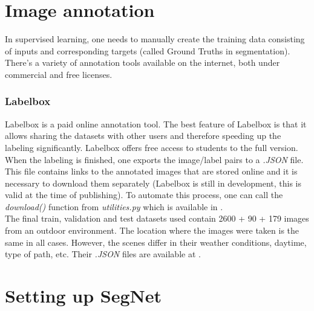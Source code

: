 \newpage
\section{Image annotation}

In supervised learning, one needs to manually create the training data consisting of inputs and corresponding targets (called Ground Truths in segmentation). There's a variety of annotation tools available on the internet, both under commercial and free licenses. 

\subsubsection{Labelbox}

Labelbox \cite{labelbox} is a paid online annotation tool. The best feature of Labelbox is that it allows sharing the datasets with other users and therefore speeding up the labeling significantly. Labelbox offers free access to students to the full version. When the labeling is finished, one exports the image/label pairs to a \textit{.JSON} file. This file contains links to the annotated images that are stored online and it is necessary to download them separately (Labelbox is still in development, this is valid at the time of publishing). To automate this process, one can call the \textit{download()} function from \textit{utilities.py} which is available in \cite{filip_github}. \\

The final train, validation and test datasets used contain 2600 + 90 + 179 images from an outdoor environment. The location where the images were taken is the same in all cases. However, the scenes differ in their weather conditions, daytime, type of path, etc. Their \textit{.JSON} files are available at \cite{filip_github}.



\section{Setting up SegNet}

